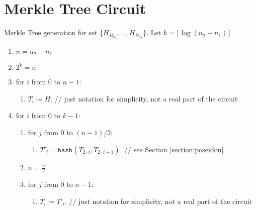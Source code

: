 \section{Merkle Tree Circuit}
\label{section:merkle}

Merkle Tree generation for set $\{H_{B_{n_1}}, ..., H_{B_{n_2}}\}$.
Let $k = \lceil \log(n_2 - n_1) \rceil$

\begin{enumerate}
    \item $n = n_2 - n_1$
    \item $2^k = n$
    \item for $i$ from $0$ to $n - 1$:
    \begin{enumerate}
        \item $T_i \coloneqq H_i$ // just notation for simplicity, not a real part of the circuit
    \end{enumerate}
    \item for $i$ from $0$ to $k - 1$:
    \begin{enumerate}
        \item for $j$ from $0$ to $(n - 1) / 2$:
        \begin{enumerate}
            \item $T'_i = \texttt{hash}(T_{2 \cdot  i}, T_{2 \cdot i + 1})$. // see Section \ref{section:poseidon}
        \end{enumerate}
        \item $n = \frac{n}{2}$
        \item for $j$ from $0$ to $n - 1$:
        \begin{enumerate}
            \item $T_i \coloneqq T'_i$. // just notation for simplicity, not a real part of the circuit
        \end{enumerate}
    \end{enumerate}
\end{enumerate}

